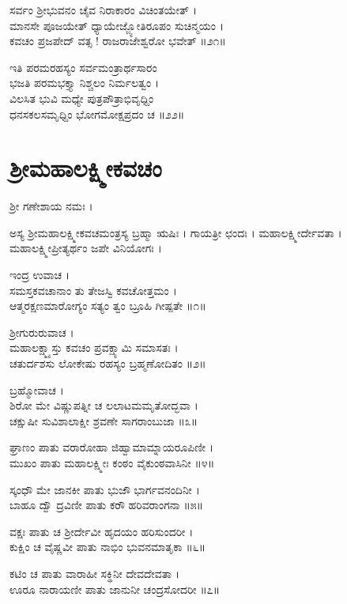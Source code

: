 ಸರ್ವಂ ಶ್ರೀಭುವನಂ ಚೈವ ನಿರಾಕಾರಂ ವಿಚಿಂತಯೇತ್ ।\\
ಮಾನಸೇ ಪೂಜಯೇತ್ ಧ್ಯಾಯೇಜ್ಜ್ಯೋತಿರೂಪಂ ಸುಚಿನ್ಮಯಂ ।\\
ಕವಚಂ ಪ್ರಜಪೇದ್ ವತ್ಸ ! ರಾಜರಾಜೇಶ್ವರೋ ಭವೇತ್ ॥೨೧॥

ಇತಿ ಪರಮರಹಸ್ಯಂ ಸರ್ವಮಂತ್ರಾರ್ಥಸಾರಂ\\
ಭಜತಿ ಪರಮಭಕ್ತ್ಯಾ ನಿಶ್ಚಲಂ ನಿರ್ಮಲತ್ವಂ ।\\
ವಿಲಸಿತ ಭುವಿ ಮಧ್ಯೇ ಪುತ್ರಪೌತ್ರಾಭಿವೃಧ್ದಿಂ\\
ಧನಸಕಲಸಮೃಧ್ದಿಂ ಭೋಗಮೋಕ್ಷಪ್ರದಂ ಚ ॥೨೨॥

\section{ಶ್ರೀಮಹಾಲಕ್ಷ್ಮೀಕವಚಂ}


ಶ್ರೀ ಗಣೇಶಾಯ ನಮಃ ।\\
ಅಸ್ಯ ಶ್ರೀಮಹಾಲಕ್ಷ್ಮೀಕವಚಮಂತ್ರಸ್ಯ ಬ್ರಹ್ಮಾ ಋಷಿಃ । ಗಾಯತ್ರೀ ಛಂದಃ । ಮಹಾಲಕ್ಷ್ಮೀರ್ದೇವತಾ । ಮಹಾಲಕ್ಷ್ಮೀಪ್ರೀತ್ಯರ್ಥಂ ಜಪೇ ವಿನಿಯೋಗಃ ।

ಇಂದ್ರ ಉವಾಚ ।\\
ಸಮಸ್ತಕವಚಾನಾಂ ತು ತೇಜಸ್ವಿ ಕವಚೋತ್ತಮಂ ।\\
ಆತ್ಮರಕ್ಷಣಮಾರೋಗ್ಯಂ ಸತ್ಯಂ ತ್ವಂ ಬ್ರೂಹಿ ಗೀಷ್ಪತೇ ॥೧॥

ಶ್ರೀಗುರುರುವಾಚ ।\\
ಮಹಾಲಕ್ಷ್ಮ್ಯಾಸ್ತು ಕವಚಂ ಪ್ರವಕ್ಷ್ಯಾಮಿ ಸಮಾಸತಃ ।\\
ಚತುರ್ದಶಸು ಲೋಕೇಷು ರಹಸ್ಯಂ ಬ್ರಹ್ಮಣೋದಿತಂ ॥೨॥

ಬ್ರಹ್ಮೋವಾಚ ।\\
ಶಿರೋ ಮೇ ವಿಷ್ಣುಪತ್ನೀ ಚ ಲಲಾಟಮಮೃತೋದ್ಭವಾ ।\\
ಚಕ್ಷುಷೀ ಸುವಿಶಾಲಾಕ್ಷೀ ಶ್ರವಣೇ ಸಾಗರಾಂಬುಜಾ ॥೩॥

ಘ್ರಾಣಂ ಪಾತು ವರಾರೋಹಾ ಜಿಹ್ವಾಮಾಮ್ನಾಯರೂಪಿಣೀ ।\\
ಮುಖಂ ಪಾತು ಮಹಾಲಕ್ಷ್ಮೀಃ ಕಂಠಂ ವೈಕುಂಠವಾಸಿನೀ ॥೪॥

ಸ್ಕಂಧೌ ಮೇ ಜಾನಕೀ ಪಾತು ಭುಜೌ ಭಾರ್ಗವನಂದಿನೀ ।\\
ಬಾಹೂ ದ್ವೌ ದ್ರವಿಣೀ ಪಾತು ಕರೌ ಹರಿವರಾಂಗನಾ ॥೫॥

ವಕ್ಷಃ ಪಾತು ಚ ಶ್ರೀರ್ದೇವೀ ಹೃದಯಂ ಹರಿಸುಂದರೀ ।\\
ಕುಕ್ಷಿಂ ಚ ವೈಷ್ಣವೀ ಪಾತು ನಾಭಿಂ ಭುವನಮಾತೃಕಾ ॥೬॥

ಕಟಿಂ ಚ ಪಾತು ವಾರಾಹೀ ಸಕ್ಥಿನೀ ದೇವದೇವತಾ ।\\
ಊರೂ ನಾರಾಯಣೀ ಪಾತು ಜಾನುನೀ ಚಂದ್ರಸೋದರೀ ॥೭॥

